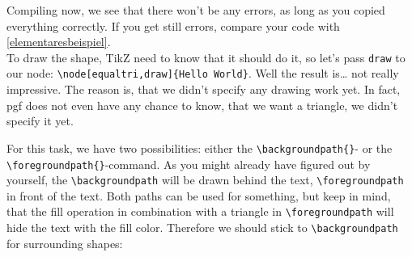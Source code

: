 \documentclass[12pt]{article}
\begin{document}
Compiling now, we see that there won't be any errors, as long as you copied everything correctly. If you get still errors, compare your code with \autoref{elementaresbeispiel}.\\
To draw the shape, TikZ need to know that it should do it, so let's pass \lstinline!draw! to our node: \lstinline!\node[equaltri,draw]{Hello World}!. Well the result is\ldots{} not really impressive. The reason is, that we didn't specify any drawing work yet. In fact, pgf does not even have any chance to know, that we want a triangle, we didn't specify it yet.\\
\begin{minipage}[l]{\k\textwidth}
For this task, we have two possibilities: either the \lstinline!\backgroundpath{}!- or the \lstinline!\foregroundpath{}!-command. As you might already have figured out by yourself, the \lstinline!\backgroundpath! will be drawn behind the text, \lstinline!\foregroundpath! in front of the text. Both paths can be used for something, but keep in mind, that the fill operation in combination with a triangle in \lstinline!\foregroundpath! will hide the text with the fill color. Therefore we should stick to \lstinline!\backgroundpath! for surrounding shapes:
\end{minipage}
\end{document}
